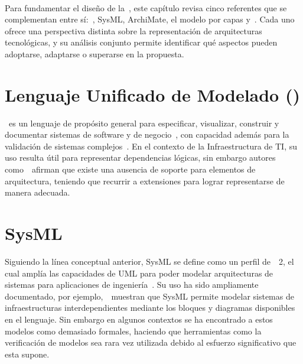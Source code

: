 \label{cap:marcoTeorico}
\mbox{}\\
\noindent
Para fundamentar el diseño de la~\NDITI{}, este capítulo revisa cinco referentes que se complementan entre sí:~\UML, SysML, ArchiMate, el modelo por capas y~\TOGAF. Cada uno ofrece una perspectiva distinta sobre la representación de arquitecturas tecnológicas, y su análisis conjunto permite identificar qué aspectos pueden adoptarse, adaptarse o superarse en la propuesta.
\section{Lenguaje Unificado de Modelado (\UML)}
\noindent
\UML~es un lenguaje de propósito general para especificar, visualizar, construir y documentar sistemas de software y de negocio~\cite{UML01}, con capacidad además para la validación de sistemas complejos~\citep{Booch01}. En el contexto de la Infraestructura de TI, su uso resulta útil para representar dependencias lógicas, sin embargo autores como~\cite{Lovelle01}~afirman que existe una ausencia de soporte para elementos de arquitectura, teniendo que recurrir a extensiones para lograr representarse de manera adecuada.

\section{SysML}
\noindent
Siguiendo la línea conceptual anterior, SysML se define como un perfil de~\UML~2, el cual amplía las capacidades de UML para poder modelar arquitecturas de sistemas para aplicaciones de ingeniería~\cite{SYSML01}. Su uso ha sido ampliamente documentado, por ejemplo,~\cite{Thompson01}~muestran que SysML permite modelar sistemas de infraestructuras interdependientes mediante los bloques y diagramas disponibles en el lenguaje. Sin embargo en algunos contextos se ha encontrado a estos modelos como demasiado formales, haciendo que herramientas como la verificación de modelos sea rara vez utilizada debido al esfuerzo significativo que esta supone.


